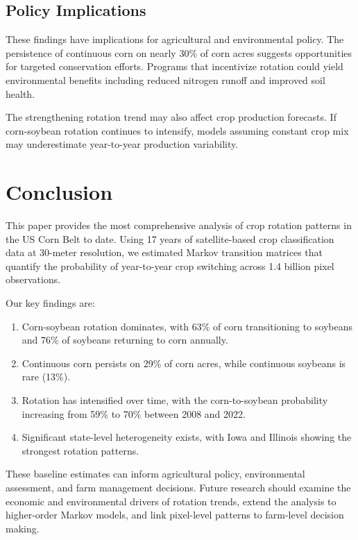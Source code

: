 \documentclass[12pt, a4paper]{article}
\begin{document}
\subsection{Policy Implications}

These findings have implications for agricultural and environmental policy. The persistence of continuous corn on nearly 30\% of corn acres suggests opportunities for targeted conservation efforts. Programs that incentivize rotation could yield environmental benefits including reduced nitrogen runoff and improved soil health.

The strengthening rotation trend may also affect crop production forecasts. If corn-soybean rotation continues to intensify, models assuming constant crop mix may underestimate year-to-year production variability.


\section{Conclusion}
\label{sec:conclusion}

This paper provides the most comprehensive analysis of crop rotation patterns in the US Corn Belt to date. Using 17 years of satellite-based crop classification data at 30-meter resolution, we estimated Markov transition matrices that quantify the probability of year-to-year crop switching across 1.4 billion pixel observations.

Our key findings are:
\begin{enumerate}[noitemsep]
    \item Corn-soybean rotation dominates, with 63\% of corn transitioning to soybeans and 76\% of soybeans returning to corn annually.
    \item Continuous corn persists on 29\% of corn acres, while continuous soybeans is rare (13\%).
    \item Rotation has intensified over time, with the corn-to-soybean probability increasing from 59\% to 70\% between 2008 and 2022.
    \item Significant state-level heterogeneity exists, with Iowa and Illinois showing the strongest rotation patterns.
\end{enumerate}

These baseline estimates can inform agricultural policy, environmental assessment, and farm management decisions. Future research should examine the economic and environmental drivers of rotation trends, extend the analysis to higher-order Markov models, and link pixel-level patterns to farm-level decision making.
\end{document}
